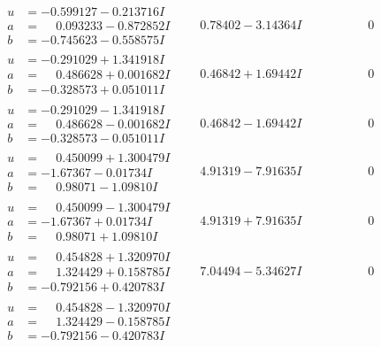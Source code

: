 \documentclass[1p]{elsarticle_modified}
\theoremstyle{definition}
\begin{document}
$$\begin{array}{c|c|c}
\begin{aligned}
u &= -0.599127 - 0.213716 I \\
a &= \phantom{-}0.093233 - 0.872852 I \\
b &= -0.745623 - 0.558575 I\end{aligned}
 & \phantom{-}0.78402 - 3.14364 I & \phantom{-0.000000 } 0 \\ \hline\begin{aligned}
u &= -0.291029 + 1.341918 I \\
a &= \phantom{-}0.486628 + 0.001682 I \\
b &= -0.328573 + 0.051011 I\end{aligned}
 & \phantom{-}0.46842 + 1.69442 I & \phantom{-0.000000 } 0 \\ \hline\begin{aligned}
u &= -0.291029 - 1.341918 I \\
a &= \phantom{-}0.486628 - 0.001682 I \\
b &= -0.328573 - 0.051011 I\end{aligned}
 & \phantom{-}0.46842 - 1.69442 I & \phantom{-0.000000 } 0 \\ \hline\begin{aligned}
u &= \phantom{-}0.450099 + 1.300479 I \\
a &= -1.67367 - 0.01734 I \\
b &= \phantom{-}0.98071 - 1.09810 I\end{aligned}
 & \phantom{-}4.91319 - 7.91635 I & \phantom{-0.000000 } 0 \\ \hline\begin{aligned}
u &= \phantom{-}0.450099 - 1.300479 I \\
a &= -1.67367 + 0.01734 I \\
b &= \phantom{-}0.98071 + 1.09810 I\end{aligned}
 & \phantom{-}4.91319 + 7.91635 I & \phantom{-0.000000 } 0 \\ \hline\begin{aligned}
u &= \phantom{-}0.454828 + 1.320970 I \\
a &= \phantom{-}1.324429 + 0.158785 I \\
b &= -0.792156 + 0.420783 I\end{aligned}
 & \phantom{-}7.04494 - 5.34627 I & \phantom{-0.000000 } 0 \\ \hline\begin{aligned}
u &= \phantom{-}0.454828 - 1.320970 I \\
a &= \phantom{-}1.324429 - 0.158785 I \\
b &= -0.792156 - 0.420783 I\end{aligned}

\end{array}$$
\end{document}
